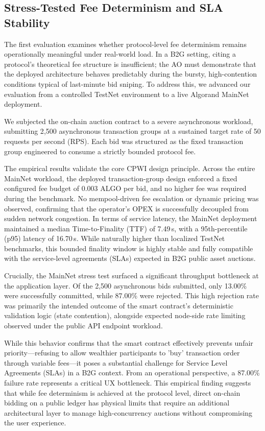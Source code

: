 \documentclass[runningheads]{llncs}
\begin{document}
\subsection{Stress-Tested Fee Determinism and SLA Stability}

The first evaluation examines whether protocol-level fee determinism remains operationally meaningful under real-world load. In a B2G setting, citing a protocol's theoretical fee structure is insufficient; the AO must demonstrate that the deployed architecture behaves predictably during the bursty, high-contention conditions typical of last-minute bid sniping. To address this, we advanced our evaluation from a controlled TestNet environment to a live Algorand MainNet deployment.

We subjected the on-chain auction contract to a severe asynchronous workload, submitting 2{,}500 asynchronous transaction groups at a sustained target rate of 50 requests per second (RPS). Each bid was structured as the fixed transaction group engineered to consume a strictly bounded protocol fee. 

The empirical results validate the core CPWI design principle. Across the entire MainNet workload, the deployed transaction-group design enforced a fixed configured fee budget of 0.003 ALGO per bid, and no higher fee was required during the benchmark. No mempool-driven fee escalation or dynamic pricing was observed, confirming that the operator's OPEX is successfully decoupled from sudden network congestion. In terms of service latency, the MainNet deployment maintained a median Time-to-Finality (TTF) of 7.49\,s, with a 95th-percentile (p95) latency of 16.70\,s. While naturally higher than localized TestNet benchmarks, this bounded finality window is highly stable and fully compatible with the service-level agreements (SLAs) expected in B2G public asset auctions.

Crucially, the MainNet stress test surfaced a significant throughput bottleneck at the application layer. Of the 2,500 asynchronous bids submitted, only 13.00\% were successfully committed, while 87.00\% were rejected. This high rejection rate was primarily the intended outcome of the smart contract's deterministic validation logic (state contention), alongside expected node-side rate limiting observed under the public API endpoint workload.

While this behavior confirms that the smart contract effectively prevents unfair priority—refusing to allow wealthier participants to 'buy' transaction order through variable fees—it poses a substantial challenge for Service Level Agreements (SLAs) in a B2G context. From an operational perspective, a 87.00\% failure rate represents a critical UX bottleneck. This empirical finding suggests that while fee determinism is achieved at the protocol level, direct on-chain bidding on a public ledger has physical limits that require an additional architectural layer to manage high-concurrency auctions without compromising the user experience.
\end{document}
